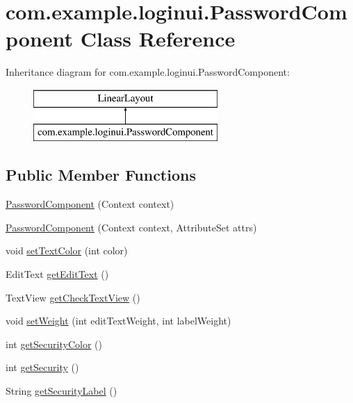 \hypertarget{classcom_1_1example_1_1loginui_1_1_password_component}{\section{com.\+example.\+loginui.\+Password\+Component Class Reference}
\label{classcom_1_1example_1_1loginui_1_1_password_component}
}
Inheritance diagram for com.\+example.\+loginui.\+Password\+Component\+:\begin{figure}[H]
\begin{center}
\leavevmode
\includegraphics[height=2.000000cm]{classcom_1_1example_1_1loginui_1_1_password_component}
\end{center}
\end{figure}
\subsection*{Public Member Functions}
\begin{DoxyCompactItemize}
\item 
\hyperlink{classcom_1_1example_1_1loginui_1_1_password_component_a592f45b8d066cbe88242f7d4d54e10f6}{Password\+Component} (Context context)
\item 
\hyperlink{classcom_1_1example_1_1loginui_1_1_password_component_aab985a65e134d997d87e9e19dab7109a}{Password\+Component} (Context context, Attribute\+Set attrs)
\item 
void \hyperlink{classcom_1_1example_1_1loginui_1_1_password_component_a9cb40d17af59e93b2a4e9bddc4113d8a}{set\+Text\+Color} (int color)
\item 
Edit\+Text \hyperlink{classcom_1_1example_1_1loginui_1_1_password_component_a7f7fe1e39d271222346e8f28a4d6a350}{get\+Edit\+Text} ()
\item 
Text\+View \hyperlink{classcom_1_1example_1_1loginui_1_1_password_component_aa3b83ce73147bb38a7f99a2db8f5e591}{get\+Check\+Text\+View} ()
\item 
void \hyperlink{classcom_1_1example_1_1loginui_1_1_password_component_a007568a347a47ba2adc2d89f2bb1c499}{set\+Weight} (int edit\+Text\+Weight, int label\+Weight)
\item 
int \hyperlink{classcom_1_1example_1_1loginui_1_1_password_component_af582c35d0504e97d2dc64a576541acf8}{get\+Security\+Color} ()
\item 
int \hyperlink{classcom_1_1example_1_1loginui_1_1_password_component_ae229a011f94d60fc121ff5b90a9f2620}{get\+Security} ()
\item 
String \hyperlink{classcom_1_1example_1_1loginui_1_1_password_component_ae1bd673295ea2d2257da424e082eb4f5}{get\+Security\+Label} ()
\end{DoxyCompactItemize}
